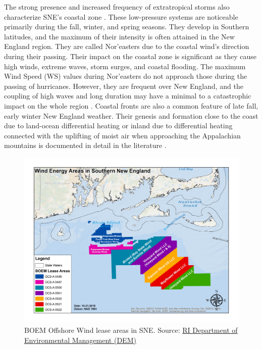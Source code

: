 The strong presence and increased frequency of extratropical storms also characterize SNE's coastal zone \cite{Vose2014}. These low-pressure systems are noticeable primarily during the fall, winter, and spring seasons. They develop in Southern latitudes, and the maximum of their intensity is often attained in the New England region. They are called Nor'easters due to the coastal wind's direction during their passing. Their impact on the coastal zone is significant as they cause high winds, extreme waves, storm surges, and coastal flooding. The maximum Wind Speed (WS) values during Nor'easters do not approach those during the passing of hurricanes. However, they are frequent over New England, and the coupling of high waves and long duration may have a minimal to a catastrophic impact on the whole region \cite{DOLAN1992}. Coastal fronts are also a common feature of late fall, early winter New England weather. Their genesis and formation close to the coast due to land-ocean differential heating or inland due to differential heating connected with the uplifting of moist air when approaching the Appalachian mountains is documented in detail in the literature \cite{Nielsen1989}.

\begin{figure}[H]
\centering
\includegraphics[width=0.95\linewidth]{Figures/Chapter1/WEAs_Map.jpg}
\caption{BOEM Offshore Wind lease areas in SNE. Source: \href{http://www.dem.ri.gov/programs/marine-fisheries/images/WEAs_Map.jpg}{RI Department of Environmental Management (DEM)}}
\label{fig:boem_lease}
\end{figure}



